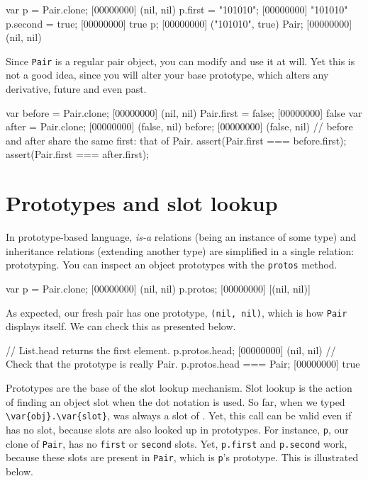 \begin{urbiscript}
var p = Pair.clone;
[00000000] (nil, nil)
p.first = "101010";
[00000000] "101010"
p.second = true;
[00000000] true
p;
[00000000] ("101010", true)
Pair;
[00000000] (nil, nil)
\end{urbiscript}

Since \lstinline|Pair| is a regular pair object, you can modify and use it
at will. Yet this is not a good idea, since you will alter your base
prototype, which alters any derivative, future and even past.

\begin{urbiscript}
var before = Pair.clone;
[00000000] (nil, nil)
Pair.first = false;
[00000000] false
var after = Pair.clone;
[00000000] (false, nil)
before;
[00000000] (false, nil)
// before and after share the same first: that of Pair.
assert(Pair.first === before.first);
assert(Pair.first === after.first);
\end{urbiscript}

\section{Prototypes and slot lookup}

In prototype-based language, \emph{is-a} relations (being an instance of
some type) and inheritance relations (extending another type) are simplified
in a single relation: prototyping. You can inspect an object prototypes with
the \lstinline{protos} method.

\begin{urbiscript}[firstnumber=1]
var p = Pair.clone;
[00000000] (nil, nil)
p.protos;
[00000000] [(nil, nil)]
\end{urbiscript}

As expected, our fresh pair has one prototype, \lstinline|(nil, nil)|, which
is how \lstinline|Pair| displays itself. We can check this as presented
below.

\begin{urbiscript}
// List.head returns the first element.
p.protos.head;
[00000000] (nil, nil)
// Check that the prototype is really Pair.
p.protos.head === Pair;
[00000000] true
\end{urbiscript}

Prototypes are the base of the slot lookup mechanism. Slot lookup is the
action of finding an object slot when the dot notation is used.  So far,
when we typed \lstinline|\var{obj}.\var{slot}|,  was always a slot
of .  Yet, this call can be valid even if  has no
 slot, because slots are also looked up in prototypes. For
instance, \lstinline|p|, our clone of \lstinline|Pair|, has no
\lstinline|first| or \lstinline|second| slots. Yet, \lstinline|p.first| and
\lstinline|p.second| work, because these slots are present in
\lstinline|Pair|, which is \lstinline|p|'s prototype. This is illustrated
below.

